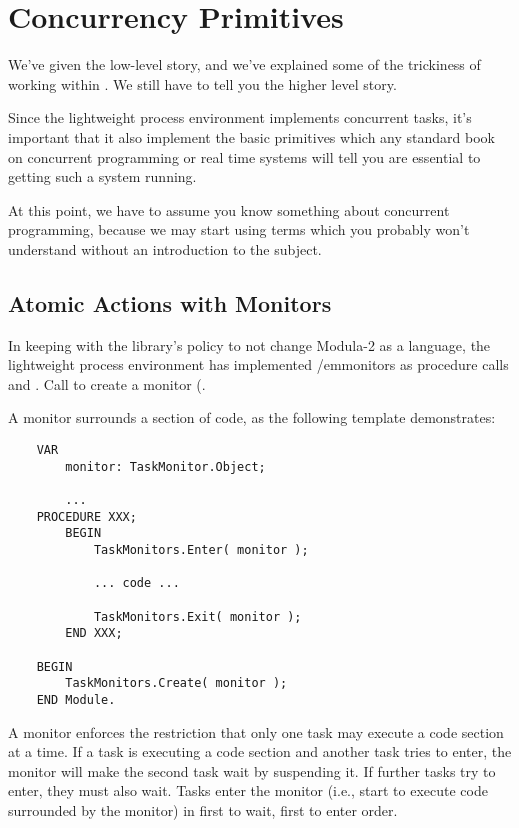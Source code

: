 \section{Concurrency Primitives}

We've given the low-level story, and we've explained some of the trickiness
of working within .  We still have to tell you the higher level
story.

Since the lightweight process environment implements concurrent tasks,
it's important that it also implement the basic primitives which any
standard book on concurrent programming or real time systems will tell
you are essential to getting such a system running.

At this point, we have to assume you know something about concurrent
programming, because we may start using terms which you probably won't
understand without an introduction to the subject.  

\subsection{Atomic Actions with Monitors}

In keeping with the library's policy to not change Modula-2 as a 
language, the lightweight process environment has implemented
/em{monitors} as procedure calls 
and .  Call 
to create a monitor (.

A monitor surrounds a section of code, as the following template demonstrates:
\begin{verbatim}
    VAR
        monitor: TaskMonitor.Object;

        ...
    PROCEDURE XXX;
        BEGIN
            TaskMonitors.Enter( monitor );
    
            ... code ...
    
            TaskMonitors.Exit( monitor );
        END XXX;

    BEGIN
        TaskMonitors.Create( monitor );
    END Module.
\end{verbatim}

A monitor enforces the restriction that only one task may execute a code
section at a time.  If a task is executing a code section and another task
tries to enter, the monitor will make the second task wait by suspending it.  
If further tasks
try to enter, they must also wait.  Tasks enter the monitor (i.e., start to
execute code surrounded by the monitor) in first to wait, first to enter
order.

